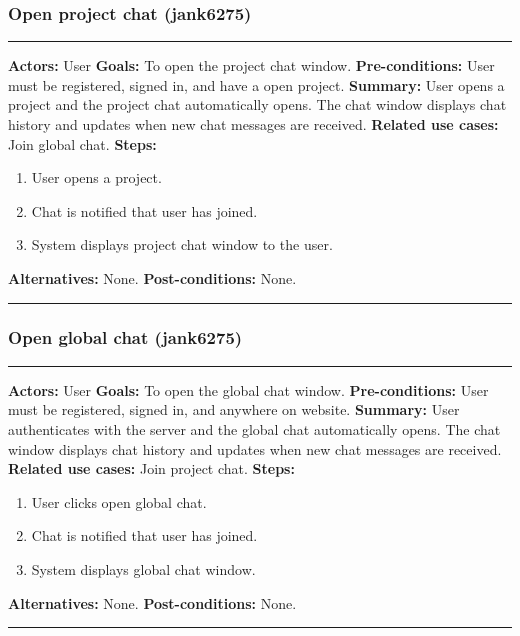 \documentclass[11pt]{report}
\begin{document}
\subsubsection{Open project chat (jank6275)}
\vspace{2pt}
\hrule
\vspace{8pt}
 \textbf{Actors:} User \newline
\textbf{Goals:} To open the project chat window. \newline
 \textbf{Pre-conditions:} User must be registered, signed in, and have a open project.  \newline
 \textbf{Summary:} User opens a project and the project chat automatically opens. The chat window displays chat history and updates when new chat messages are received. \newline
\textbf{Related use cases:} Join global chat. \newline
\textbf{Steps:} \begin{enumerate}
  \item User opens a project.
  \item Chat is notified that user has joined.
  \item System displays project chat window to the user.
 \end{enumerate}
 \textbf{Alternatives:} None. \newline
 \textbf{Post-conditions:} None. \newline
\vspace{8pt}
\hrule
\newpage

\subsubsection{Open global chat (jank6275)}
\vspace{2pt}
\hrule
\vspace{8pt}
 \textbf{Actors:} User \newline
\textbf{Goals:} To open the global chat window. \newline
 \textbf{Pre-conditions:} User must be registered, signed in, and anywhere on website.  \newline
 \textbf{Summary:} User authenticates with the server and the global chat automatically opens. The chat window displays chat history and updates when new chat messages are received.  \newline
\textbf{Related use cases:} Join project chat. \newline
\textbf{Steps:} \begin{enumerate}
  \item User clicks open global chat.
  \item Chat is notified that user has joined.
  \item System displays global chat window.
 \end{enumerate}
 \textbf{Alternatives:} None. \newline
 \textbf{Post-conditions:} None. \newline
\vspace{8pt}
\hrule
\newpage
\end{document}
